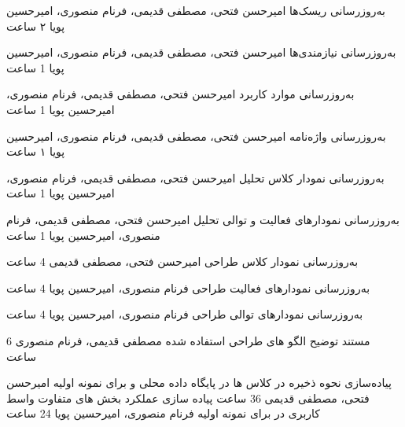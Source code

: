  
 
  
 		  به‌روزرسانی ریسک‌ها
 			  امیرحسن فتحی، مصطفی قدیمی، فرنام منصوری، امیرحسین پویا
 			   ۲ ساعت
 			 
 		
 		  به‌روزرسانی نیازمندی‌ها
 			  امیرحسن فتحی، مصطفی قدیمی، فرنام منصوری، امیرحسین پویا
 			  1 ساعت
	
		  به‌روزرسانی موارد کاربرد
			  امیرحسن فتحی، مصطفی قدیمی، فرنام منصوری، امیرحسین پویا
			  1 ساعت

		  به‌روزرسانی واژه‌نامه
			   امیرحسن فتحی، مصطفی قدیمی، فرنام منصوری، امیرحسین پویا
			  ۱ ساعت
 		
 		  به‌روزرسانی نمودار کلاس تحلیل
 			   امیرحسن فتحی، مصطفی قدیمی، فرنام منصوری، امیرحسین پویا
		 	  1 ساعت

		  به‌روزرسانی نمودارهای فعالیت و توالی تحلیل
 			   امیرحسن فتحی، مصطفی قدیمی، فرنام منصوری، امیرحسین پویا
		 	  1 ساعت

		  به‌روزرسانی نمودار کلاس طراحی
 			   امیرحسن فتحی، مصطفی قدیمی
		 	  4 ساعت

		  به‌روزرسانی نمودارهای فعالیت طراحی
 			  فرنام منصوری، امیرحسین پویا
		 	  4 ساعت

		  به‌روزرسانی نمودارهای توالی طراحی
 			  فرنام منصوری، امیرحسین پویا
		 	  4 ساعت

		  مستند توضیح الگو های طراحی استفاده شده
 			  مصطفی قدیمی، فرنام منصوری
		 	  6 ساعت

 		  پیاده‌سازی نحوه ذخیره در کلاس ها در پایگاه داده محلی و  برای نمونه اولیه
 			  امیرحسن فتحی، مصطفی قدیمی
		 	  36 ساعت
 		  پیاده سازی عملکرد بخش های متفاوت واسط کاربری در  برای نمونه اولیه
 			  فرنام منصوری، امیرحسین پویا
		 	  24 ساعت
 	
